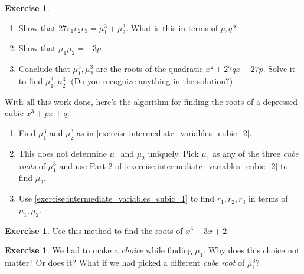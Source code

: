 \documentclass[reqno, 12pt, letter]{article}
\theoremstyle{plain}
\theoremstyle{definition}
\newtheorem{exercise}[theorem]{Exercise}
\theoremstyle{remark}
\numberwithin{equation}{section}
\begin{document}
	\begin{exercise}
		\label{exercise:intermediate_variables_cubic_2}
		$ $ 
		\begin{enumerate}
			\item Show that $27r_1  r_2  r_3 = \mu_1^3 + \mu_2^3$. What is this in terms of $ p, q$?
			\item Show that $ \mu_1 \mu_2 = -3p$.
			\item Conclude that $ \mu_1^3, \mu_2^3$ are the roots of the quadratic $ x^2 + 27qx - 27p$. Solve it to find $ \mu_1^3, \mu_2^3$. (Do you recognize anything in the solution?)
		\end{enumerate}
	\end{exercise}
	
	\begin{mdframed}
		With all this work done, here's the algorithm for finding the roots of a depressed cubic $ x^3 + px + q$:
		\begin{enumerate}
			\item Find $ \mu_1^3$ and $ \mu_2^3$ as in \autoref{exercise:intermediate_variables_cubic_2}.
			\item This does not determine $ \mu_1$ and $ \mu_2$ uniquely. Pick $ \mu_1$ as any of the three \emph{cube roots} of $ \mu_1^3$ and use Part 2 of \autoref{exercise:intermediate_variables_cubic_2} to find $ \mu_2$.
			\item Use \autoref{exercise:intermediate_variables_cubic_1} to find $ r_1, r_2, r_3$ in terms of $ \mu_1, \mu_2$. 
		\end{enumerate}
	\end{mdframed}
		\begin{exercise}
			Use this method to find the roots of $x^3 - 3x + 2$.
		\end{exercise}
		
	\begin{exercise}
		\label{exercise:no-choice}
		We had to make a \emph{choice} while finding $ \mu_1$. Why does this choice not matter? Or does it? What if we had picked a different \emph{cube root} of $ \mu_1^3$?
	\end{exercise}
	
\end{document}
